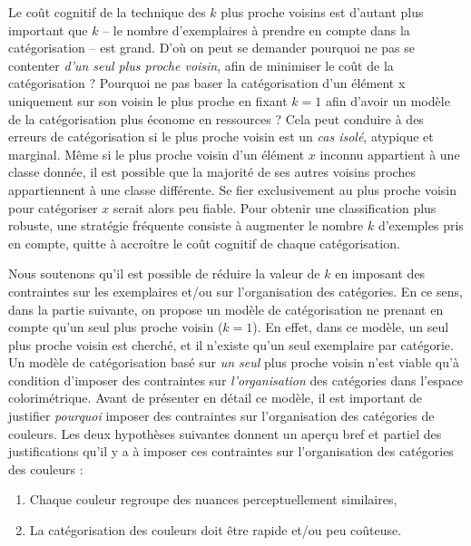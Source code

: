 \documentclass{article}
\begin{document}
\par
Le coût cognitif de la technique des $k$ plus proche voisins est d’autant plus important que $k$ -- le nombre d’exemplaires à prendre en compte dans la catégorisation -- est grand. D’où on peut se demander pourquoi ne pas se contenter \textit{d’un seul plus proche voisin}, afin de minimiser le coût de la catégorisation ? Pourquoi ne pas baser la catégorisation d'un élément x uniquement sur son voisin le plus proche en fixant $k=1$ afin d’avoir un modèle de la catégorisation plus économe en ressources ? Cela peut conduire à des erreurs de catégorisation si le plus proche voisin est un \textit{cas isolé}, atypique et marginal. Même si le plus proche voisin d'un élément $x$ inconnu appartient à une classe donnée, il est possible que la majorité de ses autres voisins proches appartiennent à une classe différente. Se fier exclusivement au plus proche voisin pour catégoriser $x$ serait alors peu fiable. Pour obtenir une classification plus robuste, une stratégie fréquente consiste à augmenter le nombre $k$ d’exemples pris en compte, quitte à accroître le coût cognitif de chaque catégorisation.
\par
Nous soutenons qu’il est possible de réduire la valeur de $k$ en imposant des contraintes sur les exemplaires et/ou sur l’organisation des catégories. En ce sens, dans la partie suivante, on propose un modèle de catégorisation ne prenant en compte qu'un seul plus proche voisin ($k=1$). En effet, dans ce modèle, un seul plus proche voisin est cherché, et il n’existe qu’un seul exemplaire par catégorie. Un modèle de catégorisation basé sur \textit{un seul} plus proche voisin n’est viable qu’à condition d’imposer des contraintes sur \textit{l’organisation} des catégories dans l’espace colorimétrique. Avant de présenter en détail ce modèle, il est important de justifier \textit{pourquoi} imposer des contraintes sur l'organisation des catégories de couleurs. Les deux hypothèses suivantes donnent un aperçu bref et partiel des justifications qu’il y a à imposer ces contraintes sur l’organisation des catégories des couleurs :

\begin{enumerate}[label=(\roman*)]
    \item Chaque couleur regroupe des nuances perceptuellement similaires,
    \item La catégorisation des couleurs doit être rapide et/ou peu coûteuse.
\end{enumerate}
\end{document}
